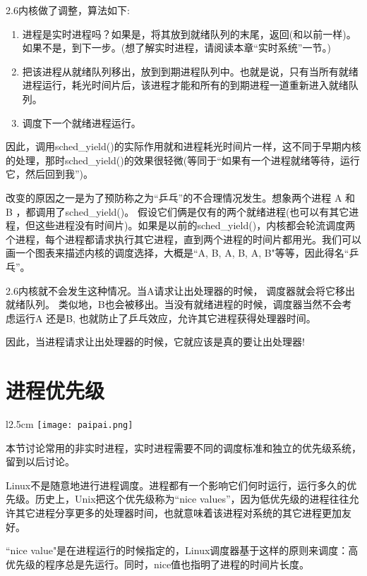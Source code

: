 2.6内核做了调整，算法如下:

\begin{enumerate}
\item 进程是实时进程吗？如果是，将其放到就绪队列的末尾，返回(和以前一样)。如果不是，到下一步。(想了解实时进程，请阅读本章“实时系统”一节。)
\item 把该进程从就绪队列移出，放到到期进程队列中。也就是说，只有当所有就绪进程运行，耗光时间片后，该进程才能和所有的到期进程一道重新进入就绪队列。
\item 调度下一个就绪进程运行。
\end{enumerate}

因此，调用sched\_yield()的实际作用就和进程耗光时间片一样，这不同于早期内核的处理，那时sched\_yield()的效果很轻微(等同于“如果有一个进程就绪等待，运行它，然后回到我”)。

改变的原因之一是为了预防称之为“乒乓”的不合理情况发生。想象两个进程 A 和 B ，都调用了sched\_yield()。 假设它们俩是仅有的两个就绪进程(也可以有其它进程，但这些进程没有时间片)。如果是以前的sched\_yield()，内核都会轮流调度两个进程，每个进程都请求执行其它进程，直到两个进程的时间片都用光。我们可以画一个图表来描述内核的调度选择，大概是``A, B, A, B, A, B"等等，因此得名“乒乓”。

2.6内核就不会发生这种情况。当A请求让出处理器的时候， 调度器就会将它移出就绪队列。 类似地，B也会被移出。当没有就绪进程的时候，调度器当然不会考虑运行A 还是B, 也就防止了乒乓效应，允许其它进程获得处理器时间。

因此，当进程请求让出处理器的时候，它就应该是真的要让出处理器!

\section{进程优先级}

\begin{wrapfigure}{l}{2.5cm}
  \texttt{[image: paipai.png]}
\end{wrapfigure}
\mbox{}\begin{flushleft}本节讨论常用的非实时进程，实时进程需要不同的调度标准和独立的优先级系统，留到以后讨论。\end{flushleft}

Linux不是随意地进行进程调度。进程都有一个影响它们何时运行，运行多久的优先级。历史上，Unix把这个优先级称为“nice values”，因为低优先级的进程往往允许其它进程分享更多的处理器时间，也就意味着该进程对系统的其它进程更加友好。

``nice value"是在进程运行的时候指定的，Linux调度器基于这样的原则来调度：高优先级的程序总是先运行。同时，nice值也指明了进程的时间片长度。


